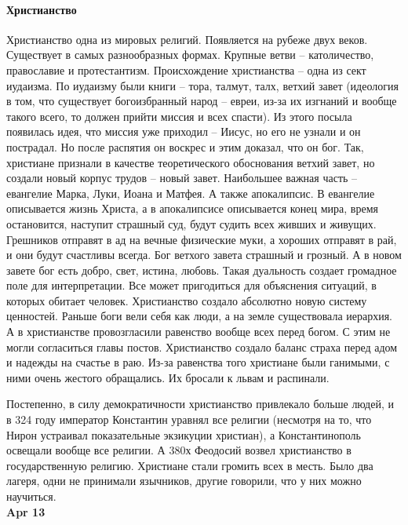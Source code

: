 \documentclass[a4paper, 12pt]{article}
\begin{document}
\paragraph{Христианство}Христианство одна из мировых религий. Появляется на рубеже двух веков. Существует в самых разнообразных формах. Крупные ветви -- католичество, православие и протестантизм. Происхождение христианства -- одна из сект иудаизма. По иудаизму были книги -- тора, талмут, талх, ветхий завет (идеология в том, что существует богоизбранный народ -- евреи, из-за их изгнаний и вообще такого всего, то должен прийти миссия и всех спасти). Из этого посыла появилась идея, что миссия уже приходил -- Иисус, но его не узнали и он пострадал. Но после распятия он воскрес и этим доказал, что он бог. Так, христиане признали в качестве теоретического обоснования ветхий завет, но создали новый корпус трудов -- новый завет. Наибольшее важная часть -- евангелие Марка, Луки, Иоана и Матфея. А также апокалипсис. В евангелие описывается жизнь Христа, а в апокалипсисе описывается конец мира, время остановится, наступит страшный суд, будут судить всех живших и живущих. Грешников отправят в ад на вечные физические муки, а хороших отправят в рай, и они будут счастливы всегда. Бог ветхого завета страшный и грозный. А в новом завете бог есть добро, свет, истина, любовь. Такая дуальность создает громадное поле для интерпретации. Все может пригодиться для объяснения ситуаций, в которых обитает человек. Христианство создало абсолютно новую систему ценностей. Раньше боги вели себя как люди, а на земле существовала иерархия. А в христианстве провозгласили равенство вообще всех перед богом. С этим не могли согласиться главы постов. Христианство создало баланс страха перед адом и надежды на счастье в раю. Из-за равенства того христиане были ганимыми, с ними очень жестого обращались. Их бросали к львам и распинали. 

Постепенно, в силу демократичности христианство привлекало больше людей, и в 324 году император Константин уравнял все религии (несмотря на то, что Нирон устраивал показательные экзикуции христиан), а Константинополь освещали вообще все религии. А 380х Феодосий возвел христианство в государственную религию. Христиане стали громить всех в месть. Было два лагеря, одни не принимали язычников, другие говорили, что у них можно научиться. \\


\hfill \textbf{Apr 13}
\end{document}
